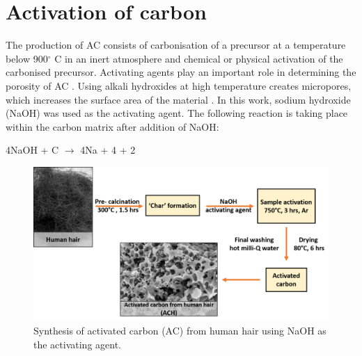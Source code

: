\documentclass{article}
\begin{document}
\section*{Activation of carbon}
The production of AC consists of carbonisation of a precursor at a temperature below 900$^{\circ}$ C in an inert atmosphere and chemical or physical activation of the carbonised precursor. Activating agents play an important role in determining the porosity of AC \cite{arenas_effect_2004}. Using alkali hydroxides at high temperature creates micropores, which increases the surface area of the material \cite{dong_commercial_2019, liu_hair-based_2017}. In this work, sodium hydroxide (NaOH) was used as the activating agent. The following reaction is taking place within the carbon matrix after addition of NaOH:

\begin{center}
    4NaOH + C $\longrightarrow$ 4Na + 4 + 2 \cite{satish_macroporous_2015}
\end{center}

\begin{figure}%
\centering
\includegraphics[width=\textwidth]{fig/ACHsyn}
\caption{Synthesis of activated carbon (AC) from human hair using NaOH as the activating agent.}
\label{fig:ACHsyn}
\end{figure}
\end{document}
